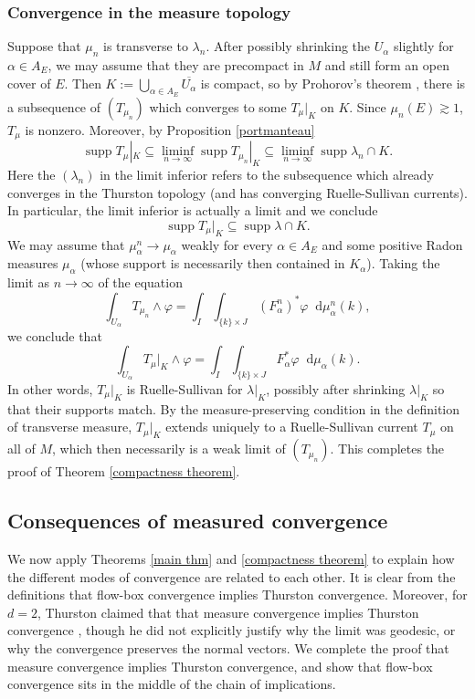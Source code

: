 \documentclass[reqno,11pt]{amsart}
\newcommand*\dif{\mathop{}\!\mathrm{d}}
\DeclareMathOperator{\supp}{supp}
\theoremstyle{definition}
\numberwithin{equation}{section}
\begin{document}
\subsubsection{Convergence in the measure topology}
Suppose that $\mu_n$ is transverse to $\lambda_n$.
After possibly shrinking the $U_\alpha$ slightly for $\alpha \in A_E$, we may assume that they are precompact in $M$ and still form an open cover of $E$.
Then $K := \bigcup_{\alpha \in A_E} \overline{U_\alpha}$ is compact, so by Prohorov's theorem \cite[Theorem 13.29]{klenke2013probability}, there is a subsequence of $(T_{\mu_n})$ which converges to some $T_\mu|_K$ on $K$.
Since $\mu_n(E) \gtrsim 1$, $T_\mu$ is nonzero.
Moreover, by Proposition \ref{portmanteau}
$$\supp T_\mu|_K \subseteq \liminf_{n \to \infty} \supp T_{\mu_n}|_K \subseteq \liminf_{n \to \infty} \supp \lambda_n \cap K.$$
Here the $(\lambda_n)$ in the limit inferior refers to the subsequence which already converges in the Thurston topology (and has converging Ruelle-Sullivan currents).
In particular, the limit inferior is actually a limit and we conclude
$$\supp T_\mu|_K \subseteq \supp \lambda \cap K.$$
We may assume that $\mu_\alpha^n \to \mu_\alpha$ weakly for every $\alpha \in A_E$ and some positive Radon measures $\mu_\alpha$ (whose support is necessarily then contained in $K_\alpha$).
Taking the limit as $n \to \infty$ of the equation 
$$\int_{U_\alpha} T_{\mu_n} \wedge \varphi = \int_I \int_{\{k\} \times J} (F_\alpha^n)^* \varphi \dif \mu_\alpha^n(k),$$
we conclude that
$$\int_{U_\alpha} T_\mu|_K \wedge \varphi = \int_I \int_{\{k\} \times J} F_\alpha^* \varphi \dif \mu_\alpha(k).$$
In other words, $T_\mu|_K$ is Ruelle-Sullivan for $\lambda|_K$, possibly after shrinking $\lambda|_K$ so that their supports match.
By the measure-preserving condition in the definition of transverse measure, $T_\mu|_K$ extends uniquely to a Ruelle-Sullivan current $T_\mu$ on all of $M$, which then necessarily is a weak limit of $(T_{\mu_n})$.
This completes the proof of Theorem \ref{compactness theorem}.


\subsection{Consequences of measured convergence}\label{relationships between modes}
We now apply Theorems \ref{main thm} and \ref{compactness theorem} to explain how the different modes of convergence are related to each other.
It is clear from the definitions that flow-box convergence implies Thurston convergence.
Moreover, for $d = 2$, Thurston claimed that that measure convergence implies Thurston convergence \cite[Proposition 8.10.3]{thurston1979geometry}, though he did not explicitly justify why the limit was geodesic, or why the convergence preserves the normal vectors.
We complete the proof that measure convergence implies Thurston convergence, and show that flow-box convergence sits in the middle of the chain of implications.
\end{document}
